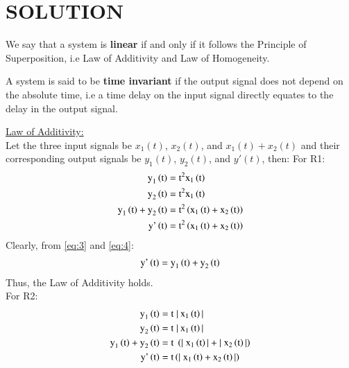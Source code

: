 \documentclass[journal,12pt,twocolumn]{IEEEtran}
\begin{document}
\section*{SOLUTION}
\begin{definition}
We say that a system is\textbf{ linear} if and only if it follows the Principle of Superposition, i.e Law of Additivity and Law of Homogeneity.
\label{L}
\end{definition}
\begin{definition}
A system is said to be \textbf{time invariant} if the output signal does not depend on the absolute time, i.e a time delay on the input signal directly equates to the delay in the output signal.
\label{T}
\end{definition}


\underline{Law of Additivity:}\\
Let the three input signals be $x_1(t)$, $x_2(t)$, and $x_1(t) + x_2(t)$  and their corresponding output signals be $y_1(t)$, $y_2(t)$, and $y'(t)$, then:
For R1:
\begin{align}
\label{eq:1}
    \text{y}_1\left(\text{t}\right) ={}& \text{t}^2\text{x}_{1}\left(\text{t}\right)\\
    \label{eq:2}
    \text{y}_2\left(\text{t}\right)  ={}& \text{t}^2\text{x}_{1}\left(\text{t}\right)\\
    \label{eq:3}
   \text{y}_1\left(\text{t}\right) +\text{y}_2\left(\text{t}\right)  ={}& \text{t}^2\left(\text{x}_{1}\left(\text{t}\right)+\text{x}_{2}\left(\text{t}\right)\right)\\
   \label{eq:4}
 \text{y'}\left(\text{t}\right) ={}& \text{t}^2\left(\text{x}_{1}\left(\text{t}\right)+\text{x}_{2}\left(\text{t}\right)\right)
\end{align}
Clearly, from \eqref{eq:3} and \eqref{eq:4}:
\begin{align}
\label{eq:5}
    \text{y'}\left(\text{t}\right) = \text{y}_1\left(\text{t}\right) +\text{y}_2\left(\text{t}\right) 
\end{align}
Thus, the Law of Additivity holds.\\
For R2:
\begin{align}
\label{eq:6}
    \text{y}_1\left(\text{t}\right) ={}& \text{t}\; |\:\text{x}_{1}\left(\text{t}\right)|\\
    \label{eq:7}
    \text{y}_2\left(\text{t}\right)  ={}& \text{t}\;|\:\text{x}_{1}\left(\text{t}\right)|\\
    \label{eq:8}
   \text{y}_1\left(\text{t}\right) +\text{y}_2\left(\text{t}\right)  ={}& \text{t}\;\left(|\;\text{x}_{1}\left(\text{t}\right)|+|\;\text{x}_{2}\left(\text{t}\right)|\right)\\
   \label{eq:9}
 \text{y'}\left(\text{t}\right) ={}& \text{t}\left(|\;\text{x}_{1}\left(\text{t}\right)+\text{x}_{2}\left(\text{t}\right)|\right)
\end{align}
\end{document}
